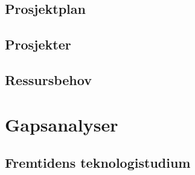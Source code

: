 \documentclass[a4paper, oneside, 12pt]{memoir}
\begin{document}
\section{Prosjektplan}

	

\section{Prosjekter}
	
	
	





\section{Ressursbehov}


\chapter{Gapsanalyser}

\section{Fremtidens teknologistudium}





\end{document}
